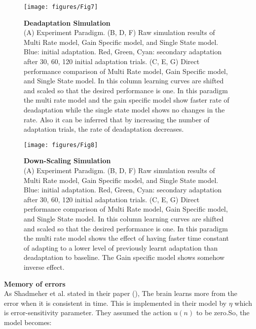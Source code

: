 \documentclass[9pt,twocolumn]{paper-template}
\begin{document}
\begin{figure}[h!]
  \centering
     \texttt{[image: figures/Fig7]}
  \caption{\textbf{Deadaptation Simulation}\\ (A)  Experiment Paradigm. (B, D, F) Raw simulation results of Multi Rate model, Gain Specific model, and Single State model. Blue: initial adaptation. Red, Green, Cyan: secondary adaptation after 30, 60, 120 initial adaptation trials. (C, E, G) Direct performance comparison of Multi Rate model, Gain Specific model, and Single State model. In this column learning curves are shifted and scaled so that the desired performance is one. In this paradigm the multi rate model and the gain specific model show faster rate of deadaptation while the single state model shows no changes in the rate. Also it can be inferred that by increasing the number of adaptation trials, the rate of deadaptation decreases. 
}
  \label{fig:Deadaptation_Simulation}
\end{figure}


\begin{figure}[h!]
  \centering
     \texttt{[image: figures/Fig8]}
  \caption{\textbf{Down-Scaling Simulation}\\ (A)  Experiment Paradigm. (B, D, F) Raw simulation results of Multi Rate model, Gain Specific model, and Single State model. Blue: initial adaptation. Red, Green, Cyan: secondary adaptation after 30, 60, 120 initial adaptation trials. (C, E, G) Direct performance comparison of Multi Rate model, Gain Specific model, and Single State model. In this column learning curves are shifted and scaled so that the desired performance is one. In this paradigm the multi rate model shows the effect of having faster time constant of adapting to a lower level of previously learnt adaptation than deadaptation to baseline. The Gain specific model shows somehow inverse effect.
}
  \label{fig:Down_Scaling_Simulation}
\end{figure}











\textbf{Memory of errors}\\

As Shadmeher et al. stated in their paper (\cite{mem_error}), The brain learns more from the error when it is consistent in time. This is implemented in their model by $\eta$ which is error-sensitivity parameter. They assumed the action $u(n)$ to be zero.So, the model becomes:
\end{document}
